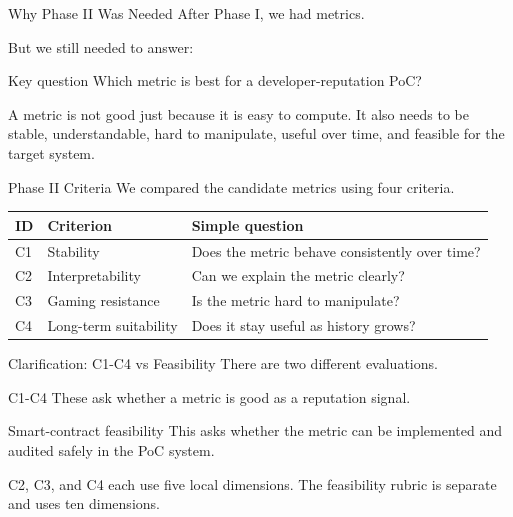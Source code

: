 \documentclass[aspectratio=169,11pt]{beamer}
\begin{document}
\begin{frame}{Why Phase II Was Needed}
  After Phase I, we had metrics.

  \vspace{0.3cm}
  But we still needed to answer:
  \begin{block}{Key question}
    Which metric is best for a developer-reputation PoC?
  \end{block}

  \vspace{0.3cm}
  A metric is not good just because it is easy to compute. It also needs to be stable, understandable, hard to manipulate, useful over time, and feasible for the target system.
\end{frame}

\begin{frame}{Phase II Criteria}
  We compared the candidate metrics using four criteria.

  \begin{table}
    \footnotesize
    \begin{tabularx}{\textwidth}{p{1.0cm}p{3.5cm}X}
      \toprule
      ID & Criterion & Simple question \\
      \midrule
      C1 & Stability & Does the metric behave consistently over time? \\
      C2 & Interpretability & Can we explain the metric clearly? \\
      C3 & Gaming resistance & Is the metric hard to manipulate? \\
      C4 & Long-term suitability & Does it stay useful as history grows? \\
      \bottomrule
    \end{tabularx}
  \end{table}
\end{frame}

\begin{frame}{Clarification: C1-C4 vs Feasibility}
  There are two different evaluations.

  \vspace{0.2cm}
  \begin{block}{C1-C4}
    These ask whether a metric is good as a reputation signal.
  \end{block}

  \begin{block}{Smart-contract feasibility}
    This asks whether the metric can be implemented and audited safely in the PoC system.
  \end{block}

  \vspace{0.2cm}
  C2, C3, and C4 each use five local dimensions. The feasibility rubric is separate and uses ten dimensions.
\end{frame}
\end{document}
